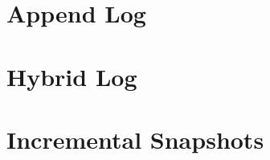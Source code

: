 \section{Append Log}



\section{Hybrid Log}


\section{Incremental Snapshots}
\label{section-incremental-snapshots}
